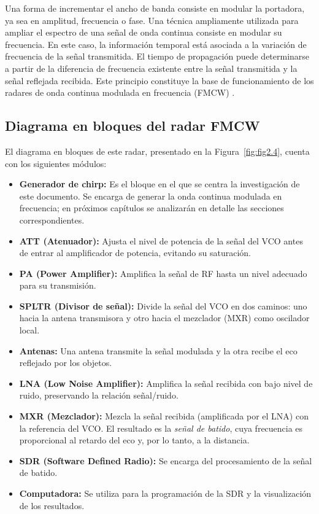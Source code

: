 Una forma de incrementar el ancho de banda consiste en modular la portadora, ya sea en amplitud, frecuencia o fase. Una técnica ampliamente utilizada para ampliar el espectro de una señal de onda continua consiste en modular su frecuencia. En este caso, la información temporal está asociada a la variación de frecuencia de la señal transmitida. El tiempo de propagación puede determinarse a partir de la diferencia de frecuencia existente entre la señal transmitida y la señal reflejada recibida. Este principio constituye la base de funcionamiento de los radares de onda continua modulada en frecuencia (FMCW) \cite{Charvat2014}.

\subsection{Diagrama en bloques del radar FMCW}
El diagrama en bloques de este radar, presentado en la Figura~\ref{fig:fig2.4}, cuenta con los siguientes módulos:
\begin{itemize}
    \item \textbf{Generador de chirp:} Es el bloque en el que se centra la investigación de este documento. Se encarga de generar la onda continua modulada en frecuencia; en próximos capítulos se analizarán en detalle las secciones correspondientes.
    
    \item \textbf{ATT (Atenuador):} Ajusta el nivel de potencia de la señal del VCO antes de entrar al amplificador de potencia, evitando su saturación.
    
    \item \textbf{PA (Power Amplifier):} Amplifica la señal de RF hasta un nivel adecuado para su transmisión.

    \item \textbf{SPLTR (Divisor de señal):} Divide la señal del VCO en dos caminos: uno hacia la antena transmisora y otro hacia el mezclador (MXR) como oscilador local.

    \item \textbf{Antenas:} Una antena transmite la señal modulada y la otra recibe el eco reflejado por los objetos.

    \item \textbf{LNA (Low Noise Amplifier):} Amplifica la señal recibida con bajo nivel de ruido, preservando la relación señal/ruido.

    \item \textbf{MXR (Mezclador):} Mezcla la señal recibida (amplificada por el LNA) con la referencia del VCO. El resultado es la \textit{señal de batido}, cuya frecuencia es proporcional al retardo del eco y, por lo tanto, a la distancia.

    \item \textbf{SDR (Software Defined Radio):} Se encarga del procesamiento de la señal de batido.

    \item \textbf{Computadora:} Se utiliza para la programación de la SDR y la visualización de los resultados.
\end{itemize}

